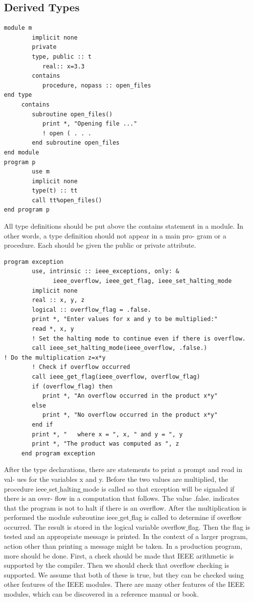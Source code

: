 \subsection{Derived Types}


\begin{verbatim}
module m
        implicit none
        private
        type, public :: t
           real:: x=3.3
        contains
           procedure, nopass :: open_files
end type
     contains
        subroutine open_files()
           print *, "Opening file ..."
           ! open ( . . .
        end subroutine open_files
end module
program p
        use m
        implicit none
        type(t) :: tt
        call tt%open_files()
end program p
\end{verbatim}

All type definitions should be put above the contains statement in a module. In other words, a type definition should not appear in a main pro- gram or a procedure. Each should be given the public or private attribute.

\begin{verbatim}
program exception
        use, intrinsic :: ieee_exceptions, only: &
              ieee_overflow, ieee_get_flag, ieee_set_halting_mode
        implicit none
        real :: x, y, z
        logical :: overflow_flag = .false.
        print *, "Enter values for x and y to be multiplied:"
        read *, x, y
        ! Set the halting mode to continue even if there is overflow.
        call ieee_set_halting_mode(ieee_overflow, .false.)
! Do the multiplication z=x*y
        ! Check if overflow occurred
        call ieee_get_flag(ieee_overflow, overflow_flag)
        if (overflow_flag) then
           print *, "An overflow occurred in the product x*y"
        else
           print *, "No overflow occurred in the product x*y"
        end if
        print *, "   where x = ", x, " and y = ", y
        print *, "The product was computed as ", z
     end program exception
\end{verbatim}


After the type declarations, there are statements to print a prompt and read in val- ues for the variables x and y. Before the two values are multiplied, the procedure ieee$\_$set$\_$halting$\_$mode is called so that exception will be signaled if there is an over- flow in a computation that follows. The value .false. indicates that the program is not to halt if there is an overflow.
After the multiplication is performed the module subroutine ieee$\_$get$\_$flag is called to determine if overflow occurred. The result is stored in the logical variable overflow$\_$flag. Then the flag is tested and an appropriate message is printed. In the context of a larger program, action other than printing a message might be taken.
In a production program, more should be done. First, a check should be made that IEEE arithmetic is supported by the compiler. Then we should check that overflow checking is supported. We assume that both of these is true, but they can be checked using other features of the IEEE modules.
There are many other features of the IEEE modules, which can be discovered in a reference manual or book.

